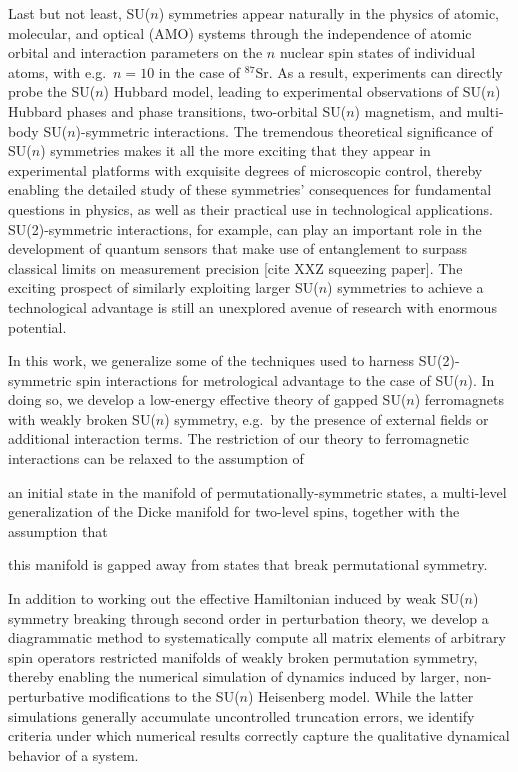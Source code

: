 \documentclass[nofootinbib,notitlepage,11pt]{revtex4-2}
\newcommand{\1}{\mathds{1}}
\newcommand{\red}[1]{{\color{red} #1}}
\begin{document}
Last but not least, SU($n$) symmetries appear naturally in the physics
of atomic, molecular, and optical (AMO)
systems\cite{gorshkov2010twoorbital, beverland2016realizing,
  cazalilla2014ultracold, taie2012su, hofrichter2016direct,
  cappellini2014direct, scazza2014observation, zhang2014spectroscopic,
  goban2018emergence, perlin2019effective} through the independence of
atomic orbital and interaction parameters on the $n$ nuclear spin
states of individual atoms, with e.g.~$n=10$ in the case of
${}^{87}$Sr.  As a result, experiments can directly probe the SU($n$)
Hubbard model, leading to experimental observations of SU($n$) Hubbard
phases and phase transitions\cite{taie2012su, hofrichter2016direct},
two-orbital SU($n$) magnetism\cite{cappellini2014direct,
  scazza2014observation, zhang2014spectroscopic}, and multi-body
SU($n$)-symmetric interactions\cite{goban2018emergence,
  perlin2019effective}.  The tremendous theoretical significance of
SU($n$) symmetries makes it all the more exciting that they appear in
experimental platforms with exquisite degrees of microscopic control,
thereby enabling the detailed study of these symmetries' consequences
for fundamental questions in physics, as well as their practical use
in technological applications.  SU(2)-symmetric interactions, for
example, can play an important role in the development of quantum
sensors that make use of entanglement to surpass classical limits on
measurement precision\cite{he2019engineering}\red{[cite XXZ squeezing
  paper]}.  The exciting prospect of similarly exploiting larger
SU($n$) symmetries to achieve a technological advantage is still an
unexplored avenue of research with enormous potential.

In this work, we generalize some of the techniques used to harness
SU(2)-symmetric spin interactions for metrological advantage to the
case of SU($n$).  In doing so, we develop a low-energy effective
theory of gapped SU($n$) ferromagnets with weakly broken SU($n$)
symmetry, e.g.~by the presence of external fields or additional
interaction terms.  The restriction of our theory to ferromagnetic
interactions can be relaxed to the assumption of
\begin{enumerate*}
\item an initial state in the manifold of permutationally-symmetric
  states, a multi-level generalization of the Dicke manifold for
  two-level spins, together with the assumption that
\item this manifold is gapped away from states that break
  permutational symmetry.
\end{enumerate*}
In addition to working out the effective Hamiltonian induced by weak
SU($n$) symmetry breaking through second order in perturbation theory,
we develop a diagrammatic method to systematically compute all matrix
elements of arbitrary spin operators restricted manifolds of weakly
broken permutation symmetry, thereby enabling the numerical simulation
of dynamics induced by larger, non-perturbative modifications to the
SU($n$) Heisenberg model.  While the latter simulations generally
accumulate uncontrolled truncation errors, we identify criteria under
which numerical results correctly capture the qualitative dynamical
behavior of a system.
\end{document}
